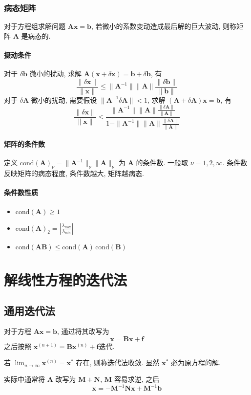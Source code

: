 \documentclass{ctexart}
\newcommand{\cond}{\mathrm{cond}}
\begin{document}
\subsubsection{病态矩阵}
    对于方程组求解问题 $\mathbf{A} \mathbf{x} = \mathbf{b}$, 若微小的系数变动造成最后解的巨大波动,
    则称矩阵 $\mathbf{A}$ 是病态的.
\paragraph{摄动条件}
    对于 $\delta \mathbf{b}$ 微小的扰动,
    求解 $\mathbf{A} (\mathbf{x} + \delta \mathbf{x}) = \mathbf{b} + \delta \mathbf{b}$, 有 \[
        \frac{\|\delta \mathbf{x}\|}{\|\mathbf{x}\|} \le %
        \|\mathbf{A}^{-1}\| \|\mathbf{A}\| \frac{\|\delta \mathbf{b}\|}{\|\mathbf{b}\|}\]
    对于 $\delta \mathbf{A}$ 微小的扰动, 需要假设 $\| \mathbf{A}^{-1} \delta \mathbf{A} \| < 1$,
    求解 $(\mathbf{A} + \delta \mathbf{A}) \mathbf{x} = \mathbf{b}$, 有 \[
        \frac{\|\delta \mathbf{x}\|}{\|\mathbf{x}\|} \le %
        \frac{\|\mathbf{A} ^{-1}\| \|\mathbf{A} \| \frac{\|\delta \mathbf{A} \|}{\|\mathbf{A} \|}}%
        { 1 -  \|\mathbf{A} ^{-1}\| \|\mathbf{A} \| \frac{\|\delta \mathbf{A} \|}{\|\mathbf{A} \|}}\]
\paragraph{矩阵的条件数}
    定义 $\cond(\mathbf{A} )_{\nu} = \|\mathbf{A} ^{-1}\|_{\nu} \|\mathbf{A}\|_{\nu}$ 为 $\mathbf{A}$ 的条件数.
    一般取 $\nu = 1, 2, \infty$.
    条件数反映矩阵的病态程度, 条件数越大, 矩阵越病态.\par
\paragraph{条件数性质}
    \begin{itemize}
        \item $\cond(\mathbf{A} ) \ge 1$
        \item $\cond(\mathbf{A} )_2 = \left| \frac{\lambda_{\max}}{\lambda_{\min}} \right|$
        \item $\cond(\mathbf{A} \mathbf{B}) \le \cond(\mathbf{A} )\, \cond(\mathbf{B})$
    \end{itemize}


\section{解线性方程的迭代法}
\subsection{通用迭代法}
    对于方程 $\mathbf{A} \mathbf{x} = \mathbf{b} $, 通过将其改写为 \[
        \mathbf{x} = \mathbf{B} \mathbf{x} + \mathbf{f} \]
    之后按照 $\mathbf{x}^{(n+1)} = \mathbf{B} \mathbf{x}^{(n)} + \mathbf{f} $迭代.\par
    若 $\lim_{n\to\infty} \mathbf{x}^{(n)} = \mathbf{x}^*$ 存在, 则称迭代法收敛.
    显然 $\mathbf{x}^*$ 必为原方程的解.\par
    实际中通常将 $\mathbf{A}$ 改写为 $\mathbf{M} + \mathbf{N}$, $\mathbf{M}$ 容易求逆, 之后 \[
        \mathbf{x} = - \mathbf{M}^{-1} \mathbf{N} \mathbf{x} + \mathbf{M}^{-1} \mathbf{b} \]
\end{document}
